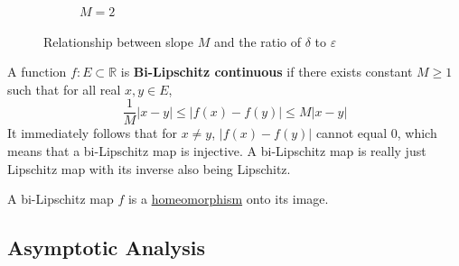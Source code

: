 \begin{figure}[H]
\begin{subfigure}[b]{0.32\textwidth}
      \caption{$M = 2$}
    \end{subfigure}
    \caption{Relationship between slope $M$ and the ratio of $\delta$ to $\varepsilon$}
    \label{fig:slope-epsilon-delta}
  \end{figure}

  \begin{definition}
    \label{def:bi-lipschitz-continuity}
    A function $f: E \subset \mathbb{R}$ is \textbf{Bi-Lipschitz continuous} if there exists constant $M\geq 1$ such that for all real $x, y \in E$, 
    \begin{equation}
      \frac{1}{M} |x - y| \leq |f(x) - f(y)| \leq M |x - y|
    \end{equation}
    It immediately follows that for $x \neq y$, $ |f(x) - f(y)|$ cannot equal $0$, which means that a bi-Lipschitz map is injective. A bi-Lipschitz map is really just Lipschitz map with its inverse also being Lipschitz. 
  \end{definition}

  \begin{theorem}
    \label{thm:bilipschitz-maps-are-homeomorphisms-onto-their}
    A bi-Lipschitz map $f$ is a \hyperref[pst-def:homeomorphism]{homeomorphism} onto its image. 
  \end{theorem}

\subsection{Asymptotic Analysis}

